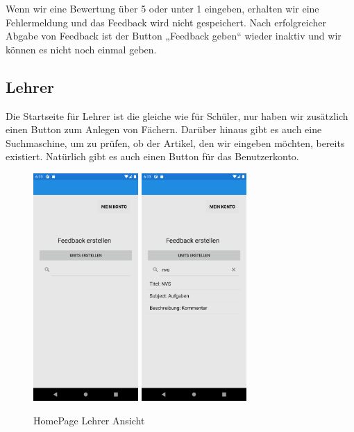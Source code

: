 \newline
Wenn wir eine Bewertung über 5 oder unter 1 eingeben, erhalten wir eine Fehlermeldung und das Feedback wird nicht gespeichert.
Nach erfolgreicher Abgabe von Feedback ist der Button „Feedback geben“ wieder inaktiv und wir können es nicht noch einmal geben.
\newpage

\subsection{Lehrer}
Die Startseite für Lehrer ist die gleiche wie für Schüler, nur haben wir zusätzlich einen Button zum Anlegen von Fächern. Darüber hinaus gibt es auch eine Suchmaschine, um zu prüfen, ob der Artikel, den wir eingeben möchten, bereits existiert. Natürlich gibt es auch einen Button für das Benutzerkonto.
\begin{figure}[h]
    \begin{center}
        \includegraphics[width=4cm]{pics/Xamarin Lehrer/2 HomePage Lehrer.png}\hfill
        \includegraphics[width=4cm]{pics/Xamarin Lehrer/3 Unit finden.png}
        \caption[HomePage]{HomePage Lehrer Ansicht}
    \end{center}
\end{figure}
